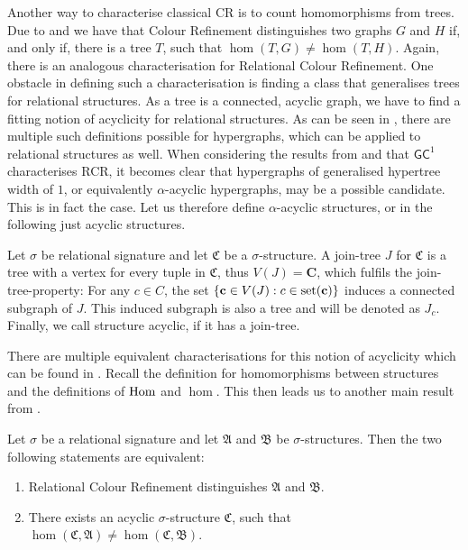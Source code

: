 Another way to characterise classical CR is to count homomorphisms from trees.
Due to \cite{dvorak2010RecognizingGraphsa} and \cite{dell2018LovaszMeets} we have that Colour Refinement distinguishes two graphs $G$ and $H$ if, and only if, there is a tree $T$, such that $\hom(T,G)\neq\hom(T,H)$.
Again, there is an analogous characterisation for Relational Colour Refinement.
One obstacle in defining such a characterisation is finding a class that generalises trees for relational structures.
As a tree is a connected, acyclic graph, we have to find a fitting notion of acyclicity for relational structures.
As can be seen in \cite{brault-baron2014HypergraphAcyclicity}, there are multiple such definitions possible for hypergraphs, which can be applied to relational structures as well.
When considering the results from \cite{scheidt2023CountingHomomorphisms} and that $\mathsf{GC}^1$ characterises RCR, it becomes clear that hypergraphs of generalised hypertree width of $1$, or equivalently $\alpha$-acyclic hypergraphs, may be a possible candidate.
This is in fact the case.
Let us therefore define $\alpha$-acyclic structures, or in the following just acyclic structures.

\begin{definition}
	\label{def:alphaAcyclic}
	Let $\sigma$ be relational signature and let $\mathfrak C$ be a $\sigma$-structure.
	A join-tree $J$ for $\mathfrak C$ is a tree with a vertex for every tuple in $\mathfrak C$, thus $V(J)=\mathbf C$, which fulfils the join-tree-property:
	For any $c\in C$, the set $\{\mathbf c \in V(J) : c\in \operatorname{set}(\mathbf c)\}$ induces a connected subgraph of $J$.
	This induced subgraph is also a tree and will be denoted as $J_c$.
	Finally, we call structure acyclic, if it has a join-tree.
\end{definition}
There are multiple equivalent characterisations for this notion of acyclicity which can be found in \cite{brault-baron2014HypergraphAcyclicity}.
Recall the definition for homomorphisms between structures and the definitions of $\operatorname{Hom}$ and $\hom$.
This then leads us to another main result from \cite{scheidt2025ColorRefinement}.

\begin{theorem}
	Let $\sigma$ be a relational signature and let $\mathfrak A$ and $\mathfrak B$ be $\sigma$-structures.
	Then the two following statements are equivalent:
	\begin{enumerate}
		\item Relational Colour Refinement distinguishes $\mathfrak A$ and $\mathfrak B$.
		\item There exists an acyclic $\sigma$-structure $\mathfrak C$, such that $\hom(\mathfrak C,\mathfrak A)\neq\hom(\mathfrak C,\mathfrak B)$.
	\end{enumerate}
\end{theorem}

